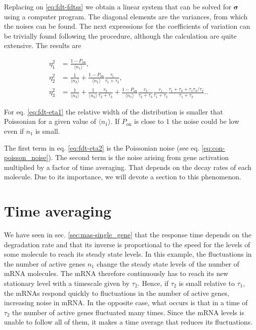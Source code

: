 Replacing on \eqref{eq:fdt-fdtss} we obtain a linear system that can be solved for $\mathbf{\sigma}$ using a computer program. The diagonal elements are the variances, from which the noises can be found. The next expressions for the coefficients of variation can be trivially found following the procedure, although the calculation are quite extensive. The results are

\begin{align}
  \eta_1^2 &= \frac{1-P_\text{on}}{\langle n_1\rangle}, \label{eq:fdt-eta1}\\
  \eta_2^2 &= \frac{1}{\langle n_2\rangle}+\frac{1-P_\text{on}}{\langle n_1\rangle}\frac{\tau_1}{\tau_1+\tau_2}, \label{eq:fdt-eta2}\\
  \eta_3^2 &= \frac{1}{\langle n_3\rangle} + \frac{1}{\langle n_2\rangle}\frac{\tau_2}{\tau_2+\tau_3}+\frac{1-P_\text{on}}{\langle n_1\rangle}\frac{\tau_2}{\tau_2+\tau_3}\frac{\tau_1}{\tau_1+\tau_3}\frac{\tau_1+\tau_3+\tau_1\tau_3/\tau_2}{\tau_1+\tau_2}. \label{eq:fdt-eta3}.
\end{align}

For eq. \eqref{eq:fdt-eta1} the relative width of the distribution is smaller that Poissonian for a given value of $\langle n_1\rangle$. If $P_\text{on}$ is close to $1$ the noise could be low even if $n_1$ is small.

The first term in eq. \eqref{eq:fdt-eta2} is the Poissonian noise (see eq. \eqref{eq:con-poisson_noise}). The second term is the noise arising from gene activation multiplied by a factor of time averaging. That depends on the decay rates of each molecule. Due to its importance, we will devote a section to this phenomenon.

\section{Time averaging}
\label{sec:fdt-time-ave}

 We have seen in sec. \ref{sec:mas-single_gene} that the response time depends on the degradation rate and that its inverse is proportional to the speed for the levels of some molecule to reach its steady state levels. In this example, the fluctuations in the number of active genes $n_1$ change the steady state levels of the number of mRNA molecules. The mRNA therefore continuously has to reach its new stationary level with a timescale given by $\tau_2$. Hence, if $\tau_2$ is small relative to $\tau_1$, the mRNAs respond quickly to fluctuations in the number of active genes, increasing noise in mRNA. In the opposite case, what occurs is that in a time of $\tau_2$ the number of active genes fluctuated many times. Since the mRNA levels is unable to follow all of them, it makes a time average that reduces its fluctuations.

